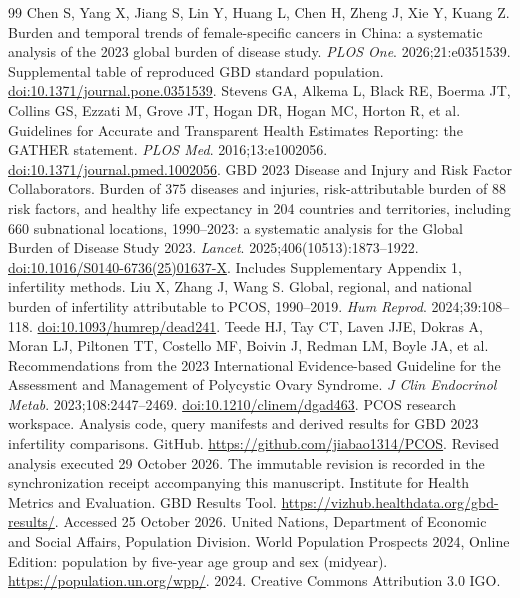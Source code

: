 \documentclass[11pt,a4paper]{article}
\begin{document}
{\small{}
\begin{thebibliography}{99}
 Chen S, Yang X, Jiang S, Lin Y, Huang L, Chen H, Zheng J, Xie Y, Kuang Z. Burden and temporal trends of female-specific cancers in China: a systematic analysis of the 2023 global burden of disease study. \emph{PLOS One}. 2026;21:e0351539. Supplemental table of reproduced GBD standard population. \href{https://doi.org/10.1371/journal.pone.0351539}{doi:10.1371/journal.pone.0351539}.
 Stevens GA, Alkema L, Black RE, Boerma JT, Collins GS, Ezzati M, Grove JT, Hogan DR, Hogan MC, Horton R, et al. Guidelines for Accurate and Transparent Health Estimates Reporting: the GATHER statement. \emph{PLOS Med}. 2016;13:e1002056. \href{https://doi.org/10.1371/journal.pmed.1002056}{doi:10.1371/journal.pmed.1002056}.
 GBD 2023 Disease and Injury and Risk Factor Collaborators. Burden of 375 diseases and injuries, risk-attributable burden of 88 risk factors, and healthy life expectancy in 204 countries and territories, including 660 subnational locations, 1990--2023: a systematic analysis for the Global Burden of Disease Study 2023. \emph{Lancet}. 2025;406(10513):1873--1922. \href{https://doi.org/10.1016/S0140-6736(25)01637-X}{doi:10.1016/S0140-6736(25)01637-X}. Includes Supplementary Appendix 1, infertility methods.
 Liu X, Zhang J, Wang S. Global, regional, and national burden of infertility attributable to PCOS, 1990--2019. \emph{Hum Reprod}. 2024;39:108--118. \href{https://doi.org/10.1093/humrep/dead241}{doi:10.1093/humrep/dead241}.
Teede HJ, Tay CT, Laven JJE, Dokras A, Moran LJ, Piltonen TT, Costello MF, Boivin J, Redman LM, Boyle JA, et al. Recommendations from the 2023 International Evidence-based Guideline for the Assessment and Management of Polycystic Ovary Syndrome. \emph{J Clin Endocrinol Metab}. 2023;108:2447--2469. \href{https://doi.org/10.1210/clinem/dgad463}{doi:10.1210/clinem/dgad463}.
 PCOS research workspace. Analysis code, query manifests and derived results for GBD 2023 infertility comparisons. GitHub. \url{https://github.com/jiabao1314/PCOS}. Revised analysis executed 29 October 2026. The immutable revision is recorded in the synchronization receipt accompanying this manuscript.
 Institute for Health Metrics and Evaluation. GBD Results Tool. \url{https://vizhub.healthdata.org/gbd-results/}. Accessed 25 October 2026.
 United Nations, Department of Economic and Social Affairs, Population Division. World Population Prospects 2024, Online Edition: population by five-year age group and sex (midyear). \url{https://population.un.org/wpp/}. 2024. Creative Commons Attribution 3.0 IGO.

\end{thebibliography}}
\end{document}
